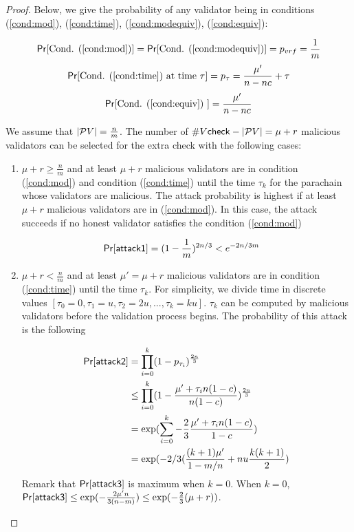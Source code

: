 \begin{proof}

Below, we give the probability of any validator being in conditions (\ref{cond:mod}), (\ref{cond:time}), (\ref{cond:modequiv}), (\ref{cond:equiv}):

$$\mathsf{Pr}[\text{Cond. (\ref{cond:mod})}] =\mathsf{Pr}[\text{Cond. (\ref{cond:modequiv})}] = p_{vrf} = \frac{1}{m}$$
$$\mathsf{Pr}[\text{Cond. (\ref{cond:time}) at time } \tau] = p_\tau =  \frac{\mu'}{n - nc} + \tau $$
$$\mathsf{Pr}[\text{Cond. (\ref{cond:equiv}) }] = \frac{\mu'}{n - nc} $$


We assume that $|\mathcal{P}V| = \frac{n}{m}$.  The number of $\#V\mathsf{check}-|\mathcal{P}V| = \mu + r$ malicious validators can be selected for the extra check with the following cases:

\begin{enumerate}
    
    \item $\mu + r \geq \frac{n}{m}$ and at least $\mu + r$ malicious validators are in condition (\ref{cond:mod}) and condition (\ref{cond:time}) until the time $\tau_k$ for the parachain whose validators are malicious. The attack probability is highest if at least $\mu + r$
    malicious validators are in (\ref{cond:mod}). In this case, the attack succeeds if no honest validator satisfies the condition (\ref{cond:mod}) 
    
    
    \begin{align}\label{eq:attack2}
        \mathsf{Pr}[\mathsf{attack1}] &= (1-\frac{1}{m})^{2n/3} <  e^{-2n/3m} \nonumber
    \end{align}
    
    
    \item $\mu+r < \frac{n}{m}$ and at least $\mu' = \mu+r$ malicious validators are in condition (\ref{cond:time}) until the time $\tau_k$. For simplicity, we divide time in discrete values $[\tau_0 = 0, \tau_1 =u, \tau_2 = 2u, ..., \tau_k = ku]$. $\tau_k$ can be computed by malicious validators before the validation process begins. The probability of this attack is the following
    
    \begin{align}
        \mathsf{Pr}[\mathsf{attack2}] &= \prod_{i = 0}^k(1-p_{\tau_i})^{\frac{2n}{3}} \nonumber\\
        &\leq  \prod_{i = 0}^k (1 - \frac{\mu'+\tau_in(1-c)}{n(1-c)})^{\frac{2n}{3}} \nonumber\\
        &=  \exp(\sum_{i = 0}^k -\frac{2}{3}\frac{\mu' + \tau_in(1-c)}{1-c}) \nonumber\\
        & = \exp(-2/3(\frac{(k+1)\mu'}{1-m/n}+ nu\frac{k(k+1)}{2})\nonumber
    \end{align}
    Remark that $\mathsf{Pr}[\mathsf{attack3}]$ is maximum when $k = 0$. When $k = 0$, $\mathsf{Pr}[\mathsf{attack3}] \leq \exp(-\frac{2\mu' n}{3(n-m)}) \leq \exp(-\frac{2}{3}(\mu + r))$.
    

\end{enumerate}
\end{proof}
